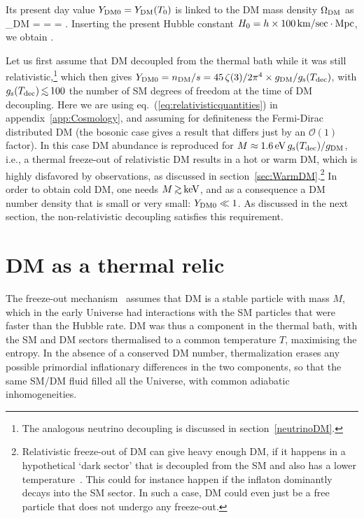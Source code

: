 Its present day value
$Y_{\rm DM 0} = Y_{\rm DM}(T_0)$
is linked to the DM mass density $\Omega_{\rm DM}$ as
\beq 
\label{eq:OmegaDMY}
\Omega_{\rm DM} =  = 
= .
\eeq
Inserting the present Hubble constant $H_0 = h\times 100\,{\rm km}/{\rm sec\cdot Mpc}$, we obtain
\beq {}
\label{eq:YDM0}
. 
\eeq

Let us first assume that DM decoupled from the thermal bath while it was still relativistic,\footnote{The analogous neutrino decoupling is discussed in section~\ref{neutrinoDM}.} which then gives $Y_{\rm DM0} = n_{\rm DM}/s = 45 \, \zeta(3)/2 \pi^4 \times g_{\rm DM}/g_{\rm s}(T_{\rm dec})$,
with $g_{\rm s}(T_{\rm dec})\circa{<}100$ the number of SM degrees of freedom at the time of DM decoupling. Here we are using eq.~(\ref{eq:relativisticquantities}) in appendix~\ref{app:Cosmology}, and assuming for definiteness the Fermi-Dirac distributed DM (the bosonic case gives a result that differs just by an $\mathcal{O}(1)$ factor). 
In this case DM abundance is reproduced for
 $M \approx 1.6 \,{\rm eV}\, g_{\rm s}(T_{\rm dec})/g_{\rm DM}$,
  i.e., a thermal freeze-out of relativistic DM results in a hot or warm DM, which is highly disfavored by observations, as discussed in section~\ref{sec:WarmDM}.\footnote{Relativistic freeze-out of DM  
can give heavy enough DM, if it happens in a hypothetical `dark sector' that is decoupled from the SM and also has a lower temperature~\cite{DMrelFO}. This could for instance happen if the inflaton dominantly  decays into the SM sector.
In such a case, DM could even just be a free particle that does not undergo any freeze-out.} 
In order to obtain cold DM, one needs $M\circa{>}{\rm keV}$, and as a consequence a DM number density that is small or very small: $Y_{\rm DM0} \ll 1$.
As discussed in the next section, the non-relativistic decoupling satisfies this requirement.





\section{DM as a thermal relic}\label{sec:thermal_relic} 
The freeze-out mechanism~\cite{cosmobooks,DMFO} assumes that DM is a stable particle with mass $M$, 
which in the early Universe had interactions with the SM particles that were faster than the Hubble rate.
DM was thus a component in the thermal bath, with the SM and DM sectors thermalised to a common temperature $T$, maximising the entropy. In the absence of a conserved DM number, thermalization erases any possible primordial inflationary differences in the two components,
so that the same SM/DM fluid filled all the Universe, with common adiabatic inhomogeneities.

